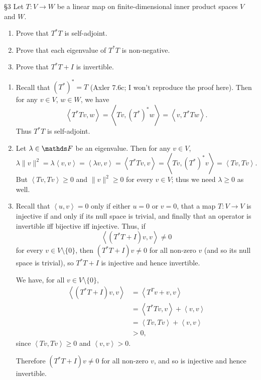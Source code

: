 \documentclass{review-sheet}
\begin{document}
\begin{problem}{\S 3}
  Let $T:V\to W$ be a linear map on finite-dimensional inner product spaces $V$ and $W$.
  \begin{enumerate}[label=(\alph*)]
    \item Prove that $T^*T$ is self-adjoint.
    \item Prove that each eigenvalue of $T^*T$ is non-negative.
    \item Prove that $T^*T+I$ is invertible.
  \end{enumerate}
\end{problem}
\begin{solution}
  \begin{enumerate}[label=(\alph*)]
    \item Recall that $(T^*)^*=T$ (Axler 7.6c; I won't reproduce the proof here). Then for any $v\in V$,
      $w\in W$, we have \[
        \left<T^*Tv,w \right> =\left<Tv,(T^*)^*w \right> =\left<v,T^*Tw \right> 
      .\] Thus $T^*T$ is self-adjoint.
    \item Let $\lambda\in \F$ be an eigenvalue. Then for any $v\in V$, \[
        \lambda\|v\|^2=\lambda\left<v,v \right> =\left<\lambda v,v \right> =\left<T^*Tv,v \right>
        =\left<Tv,(T^*)^*v \right> =\left<Tv,Tv \right> 
      .\] But $\left<Tv,Tv \right> \ge 0$ and $\|v\|^2\ge 0$ for every $v\in V$; thus we need
      $\lambda\ge 0$ as well.
    \item Recall that $\left<u,v \right> =0$ only if either $u=0$ or $v=0$, that a map $T:V\to V$ is
      injective if and only if its null space is trivial, and finally that an operator is invertible
      iff bijective iff injective. Thus, if \[
        \left<(T^*T+I)v,v \right> \neq 0
      \] for every $v\in V\setminus \{ 0 \}$, then $(T^*T+I)v\neq 0$ for all non-zero $v$ (and so
      its null space is trivial), so $T^*T+I$ is injective and hence invertible.

      We have, for all $v\in V\setminus \{ 0 \}$,
      \begin{align*}
        \left<(T^*T+I)v,v \right> &= \left<T^Tv+v,v \right>  \\
                                  &= \left<T^*Tv,v \right> +\left<v,v \right>  \\
                                  &= \left<Tv,Tv \right> +\left<v,v \right>  \\
                                  &>0
      ,\end{align*} since $\left<Tv,Tv \right> \ge 0$ and $\left<v,v \right> >0$.

      Therefore $(T^*T+I)v\neq 0$ for all non-zero $v$, and so is injective and hence invertible.
  \end{enumerate}
\end{solution}
\end{document}
